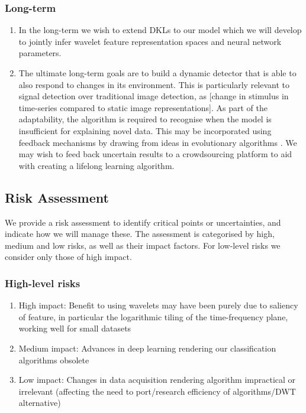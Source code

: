 \documentclass[12pt]{llncs}
\begin{document}
\subsubsection{Long-term}
\begin{enumerate}
	\item In the long-term we wish to extend DKLs to our model which we will develop to jointly infer wavelet feature representation spaces and neural network parameters.
	\item The ultimate long-term goals are to build a dynamic detector that is able to also respond to changes in its environment. This is particularly relevant to signal detection over traditional image detection, as [change in stimulus in time-series compared to static image representations]. As part of the adaptability, the algorithm is required to recognise when the model is insufficient for explaining novel data. This may be incorporated using feedback mechanisms by drawing from ideas in evolutionary algorithms \cite{coello2007evolutionary}. We may wish to feed back uncertain results to a crowdsourcing platform to aid with creating a lifelong learning algorithm.
\end{enumerate}



\subsection{Risk Assessment}
We provide a risk assessment to identify critical points or uncertainties, and indicate how we will manage these. The assessment is categorised by high, medium and low risks, as well as their impact factors. For low-level risks we consider only those of high impact.

\subsubsection{High-level risks} 
\begin{enumerate} 
\item High impact: Benefit to using wavelets may have been purely due to saliency of feature, in particular the logarithmic tiling of the time-frequency plane, working well for small datasets
\item Medium impact: Advances in deep learning rendering our classification algorithms obsolete
\item Low impact: Changes in data acquisition rendering algorithm impractical or irrelevant (affecting the need to port/research efficiency of algorithms/DWT alternative)


\end{enumerate}
\end{document}
